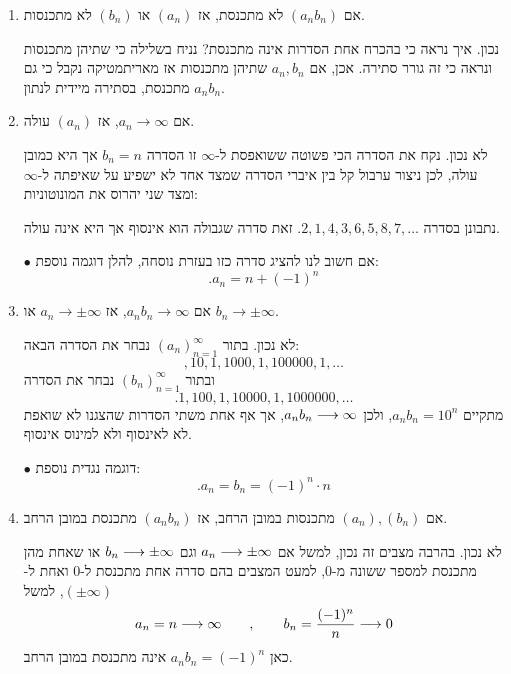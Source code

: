 \begin{enumerate}
\begin{solbox}
$\bullet$
        דוגמה נגדית נוספת היא הסדרה
        $0,1,0,2,0,3,0,4,\ldots$
        שאינה חסומה מלעיל לכן אינה חסומה, וגם לא מתכנסת במובן הרחב כלל, בפרט לא ל-$\infty$
        ולא ל-$(-\infty)$.
\end{solbox}
    \item אם
    $(a_nb_n)$
    לא מתכנסת, אז
    $(a_n)$
    או
    $(b_n)$
    לא מתכנסות.
\begin{solbox}
      נכון. איך נראה כי בהכרח אחת הסדרות אינה מתכנסת? נניח בשלילה כי שתיהן מתכנסות ונראה כי זה גורר סתירה.
      אכן, אם
      $a_n,b_n$
      שתיהן מתכנסות אז מאריתמטיקה נקבל כי גם
      $a_nb_n$
      מתכנסת, בסתירה מיידית לנתון.
\end{solbox}
    \item
    אם
    $a_n\to\infty$,
    אז
    $(a_n)$
    עולה.
\begin{solbox}
    לא נכון. נקח את הסדרה הכי פשוטה ששואפסת ל-$\infty$
    זו הסדרה
    $b_n=n$
    אך היא כמובן עולה, לכן ניצור ערבול קל בין איברי הסדרה שמצד אחד לא ישפיע על שאיפתה ל-$\infty$
    ומצד שני יהרוס את המונוטוניות:

    נתבונן בסדרה
    $.2,1,4,3,6,5,8,7,\ldots$
    זאת סדרה שגבולה הוא אינסוף
    אך היא אינה עולה.

$\bullet$
    אם חשוב לנו להציג סדרה כזו בעזרת נוסחה, להלן דוגמה נוספת:
    $$.a_n=n+(-1)^n$$
\end{solbox}
    \item
    אם
    $a_nb_n\to \infty$,
    אז
    $a_n\to\pm\infty$
    או
    $b_n\to\pm\infty$.
\begin{solbox}
לא נכון.
    בתור
    $(a_n)_{n=1}^\infty$
    נבחר את הסדרה הבאה:
    $$,10,1,1000,1,100000,1,\ldots$$
    ובתור
    $(b_n)_{n=1}^\infty$
    נבחר את הסדרה
    $$.1,100,1,10000,1,1000000,\ldots$$
    מתקיים
    $a_nb_n=10^n$,
    ולכן
    $a_nb_n\longrightarrow\infty$, אך אף אחת משתי הסדרות שהצגנו לא שואפת לא לאינסוף ולא למינוס אינסוף.

$\bullet$
דוגמה נגדית נוספת:
$$.a_n=b_n=(-1)^n\cdot n$$
\end{solbox}
    \item
    אם
    $(a_n),(b_n)$
    מתכנסות במובן הרחב, אז
    $(a_nb_n)$
    מתכנסת במובן הרחב.
\begin{solbox}
        לא נכון.
        בהרבה מצבים זה נכון, למשל אם
        $a_n\longrightarrow\pm\infty$
        וגם
        $b_n\longrightarrow\pm\infty$
        או שאחת מהן מתכנסת למספר ששונה מ-$0$, למעט המצבים בהם סדרה אחת מתכנסת ל-$0$
        ואחת ל-$(\pm\infty)$, למשל
        $$a_n=n\longrightarrow\infty\qquad,\qquad b_n=\frac{(-1)^n}{n}\longrightarrow0$$
        כאן
        $a_nb_n=(-1)^n$
        אינה מתכנסת במובן הרחב.
\end{solbox}


\end{enumerate}
